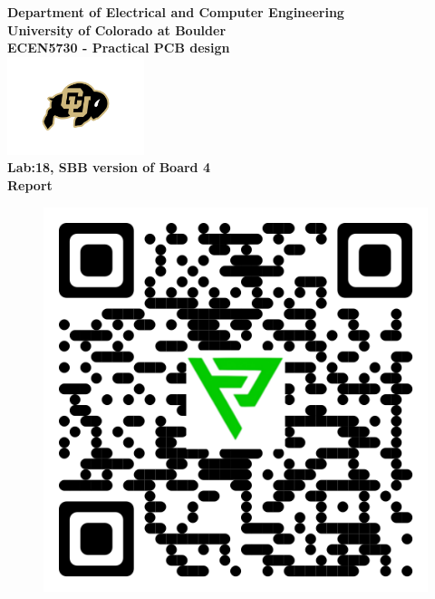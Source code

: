 \begin{titlepage}
\center %

\textbf{\large Department of Electrical and Computer Engineering}\\[0.5cm]
\textbf{\Large University of Colorado at Boulder}\\[1cm]
\textbf{\large ECEN5730 - Practical PCB design}\\[2cm]
\includegraphics[width=0.3\textwidth]{figures/cu}\\[2cm] 

	

\textbf{\Huge Lab:18, SBB version of Board 4}\\[0.2cm]

\textbf{\Large Report}\\[2cm]
\vspace{1.5cm}
\begin{figure}[H]
	\centering
	\includegraphics[scale=0.2]{figures/qr_download.png}
	\label{555_schematic}
\end{figure}\vspace{1.5cm}



\end{titlepage}

